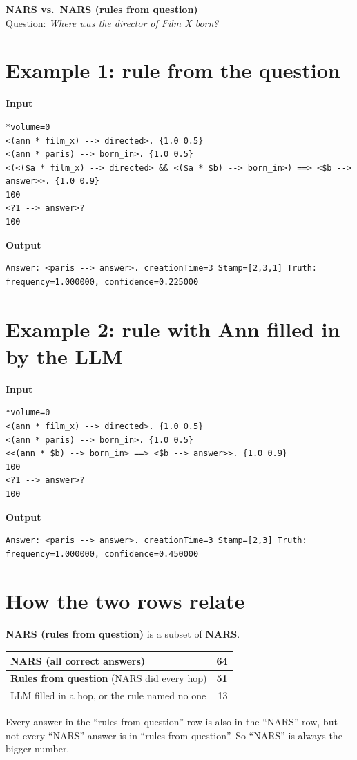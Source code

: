 \documentclass[11pt]{article}
\begin{document}
\begin{center}
  {\Large\bfseries NARS vs.\ NARS (rules from question)}\\[4pt]
  {\small Question: \emph{Where was the director of Film X born?}}
\end{center}

\section*{Example 1: rule from the question}
\textbf{Input}
\begin{lstlisting}[style=narsese]
*volume=0
<(ann * film_x) --> directed>. {1.0 0.5}
<(ann * paris) --> born_in>. {1.0 0.5}
<(<($a * film_x) --> directed> && <($a * $b) --> born_in>) ==> <$b --> answer>>. {1.0 0.9}
100
<?1 --> answer>?
100
\end{lstlisting}
\textbf{Output}
\begin{lstlisting}[style=narsese]
Answer: <paris --> answer>. creationTime=3 Stamp=[2,3,1] Truth: frequency=1.000000, confidence=0.225000
\end{lstlisting}

\section*{Example 2: rule with Ann filled in by the LLM}
\textbf{Input}
\begin{lstlisting}[style=narsese]
*volume=0
<(ann * film_x) --> directed>. {1.0 0.5}
<(ann * paris) --> born_in>. {1.0 0.5}
<<(ann * $b) --> born_in> ==> <$b --> answer>>. {1.0 0.9}
100
<?1 --> answer>?
100
\end{lstlisting}
\textbf{Output}
\begin{lstlisting}[style=narsese]
Answer: <paris --> answer>. creationTime=3 Stamp=[2,3] Truth: frequency=1.000000, confidence=0.450000
\end{lstlisting}

\section*{How the two rows relate}
\textbf{NARS (rules from question)} is a subset of \textbf{NARS}.

\begin{center}
\begin{tabular}{@{}lr@{}}
  \toprule
  \textbf{NARS} (all correct answers) & \textbf{64} \\
  \midrule
  \quad\textcolor{accent}{\textbf{Rules from question}} (NARS did every hop) & \textcolor{accent}{\textbf{51}} \\
  \quad LLM filled in a hop, or the rule named no one & 13 \\
  \bottomrule
\end{tabular}
\end{center}

Every answer in the ``rules from question'' row is also in the ``NARS'' row, but not every ``NARS'' answer is in
``rules from question''. So ``NARS'' is always the bigger number.
\end{document}
